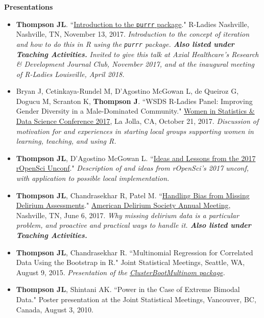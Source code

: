 \documentclass[5pt]{article}
\begin{document}
\noindent \textbf{Presentations}
\begin{itemize}
\item \textbf{Thompson JL}. ``\href{github.com/jenniferthompson/RLadiesIntroToPurrr}{Introduction to the \texttt{purrr} package}." R-Ladies Nashville, Nashville, TN, November 13, 2017. \emph{Introduction to the concept of iteration and how to do this in R using the \texttt{purrr} package. \textbf{Also listed under Teaching Activities.}}
\indent \emph{Invited to give this talk at Axial Healthcare's Research \& Development Journal Club, November 2017, and at the inaugural meeting of R-Ladies Louisville, April 2018.}
\item Bryan J, Cetinkaya-Rundel M, D'Agostino McGowan L, de Queiroz G, Dogucu M, Scranton K, \textbf{Thompson J}. ``WSDS R-Ladies Panel: Improving Gender Diversity in a Male-Dominated Community." \href{https://ww2.amstat.org/meetings/wsds/2017/onlineprogram/AbstractDetails.cfm?AbstractID=303812}{Women in Statistics \& Data Science Conference 2017}, La Jolla, CA, October 21, 2017. \emph{Discussion of motivation for and experiences in starting local groups supporting women in learning, teaching, and using R.}
\item \textbf{Thompson JL}, D'Agostino McGowan L. ``\href{https://tinyurl.com/vubiostat-runconf17}{Ideas and Lessons from the 2017 rOpenSci Unconf}." \emph{Description of and ideas from rOpenSci's 2017 unconf, with application to possible local implementation.}
\item \textbf{Thompson JL}, Chandrasekhar R, Patel M. ``\href{https://github.com/jenniferthompson/ADS2017}{Handling Bias from Missing Delirium Assessments}." \href{http://www.cvent.com/events/7th-annual-american-delirium-society/event-summary-cd74fed5605a4918bc0a9c0e28561bac.aspx}{American Delirium Society Annual Meeting}, Nashville, TN, June 6, 2017. \emph{Why missing delirium data is a particular problem, and proactive and practical ways to handle it. \textbf{Also listed under Teaching Activities.}}
\item \textbf{Thompson JL}, Chandrasekhar R. ``Multinomial Regression for Correlated Data Using the Bootstrap in R." Joint Statistical Meetings, Seattle, WA, August 9, 2015. \emph{Presentation of the \href{https://github.com/jenniferthompson/ClusterBootMultinom}{ClusterBootMultinom package}.}
\item \textbf{Thompson JL}, Shintani AK. ``Power in the Case of Extreme Bimodal Data." Poster presentation at the Joint Statistical Meetings, Vancouver, BC, Canada, August 3, 2010.
\end{itemize}
\end{document}
